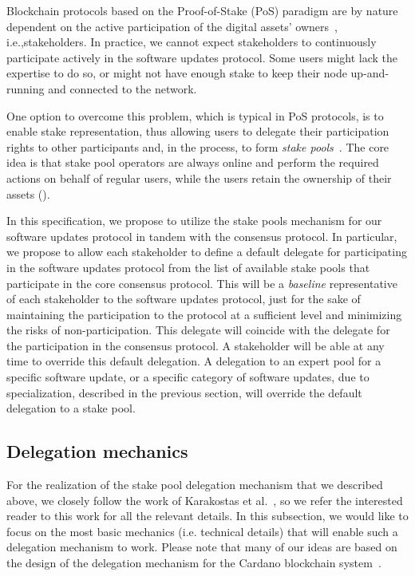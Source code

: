 \documentclass[11pt,a4paper]{article}
\begin{document}
Blockchain protocols based on the Proof-of-Stake (PoS) paradigm are by nature
dependent on the active participation of the digital assets'
owners~\cite{stakepools}, i.e.,stakeholders.
%
In practice, we cannot expect stakeholders to continuously participate actively
in the software updates protocol.
%
Some users might lack the expertise to do so, or might not have enough stake to
keep their node up-and-running and connected to the network.

One option to overcome this problem, which is typical in PoS protocols, is to
enable stake representation, thus allowing users to delegate their participation
rights to other participants and, in the process, to form \emph{stake
  pools}~\cite{stakepools}. The core idea is that stake pool operators are
always online and perform the required actions on behalf of regular users, while
the users retain the ownership of their assets (\cite{stakepools}).

In this specification, we propose to utilize the stake pools mechanism for our
software updates protocol in tandem with the consensus protocol. In particular,
we propose to allow each stakeholder to define a default delegate for
participating in the software updates protocol from the list of available stake
pools that participate in the core consensus protocol.
%
This will be a \emph{baseline} representative of each stakeholder to the
software updates protocol, just for the sake of maintaining the participation to
the protocol at a sufficient level and minimizing the risks of
non-participation. This delegate will coincide with the delegate for the
participation in the consensus protocol. A stakeholder will be able at any time
to override this default delegation. A delegation to an expert pool for a
specific software update, or a specific category of software updates, due to
specialization, described in the previous section, will override the default
delegation to a stake pool.

\subsection{Delegation mechanics}
\label{sec:delegation-mechanics}

For the realization of the stake pool delegation mechanism that we described
above, we closely follow the work of Karakostas et al.~\cite{stakepools}, so we
refer the interested reader to this work for all the relevant details.
%
In this subsection, we would like to focus on the most basic mechanics (i.e.
technical details) that will enable such a delegation mechanism to work. Please
note that many of our ideas are based on the design of the delegation mechanism
for the Cardano blockchain system~\cite{deldesign}.
\end{document}

